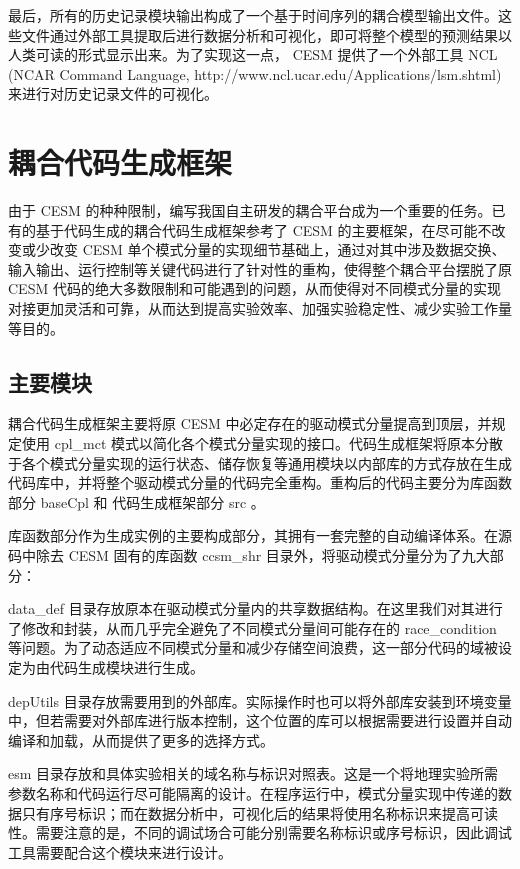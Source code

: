 最后，所有的历史记录模块输出构成了一个基于时间序列的耦合模型输出文件。这些文件通过外部工具提取后进行数据分析和可视化，即可将整个模型的预测结果以人类可读的形式显示出来。为了实现这一点， CESM 提供了一个外部工具 NCL (NCAR Command Language, http://www.ncl.ucar.edu/Applications/lsm.shtml)来进行对历史记录文件的可视化。

\section{耦合代码生成框架}

由于 CESM 的种种限制，编写我国自主研发的耦合平台成为一个重要的任务。已有的基于代码生成的耦合代码生成框架参考了 CESM 的主要框架，在尽可能不改变或少改变 CESM 单个模式分量的实现细节基础上，通过对其中涉及数据交换、输入输出、运行控制等关键代码进行了针对性的重构，使得整个耦合平台摆脱了原 CESM 代码的绝大多数限制和可能遇到的问题，从而使得对不同模式分量的实现对接更加灵活和可靠，从而达到提高实验效率、加强实验稳定性、减少实验工作量等目的。

\subsection{主要模块}

耦合代码生成框架主要将原 CESM 中必定存在的驱动模式分量提高到顶层，并规定使用 cpl\_mct 模式以简化各个模式分量实现的接口。代码生成框架将原本分散于各个模式分量实现的运行状态、储存恢复等通用模块以内部库的方式存放在生成代码库中，并将整个驱动模式分量的代码完全重构。重构后的代码主要分为库函数部分 baseCpl 和 代码生成框架部分 src 。

库函数部分作为生成实例的主要构成部分，其拥有一套完整的自动编译体系。在源码中除去 CESM 固有的库函数 ccsm\_shr 目录外，将驱动模式分量分为了九大部分：

data\_def 目录存放原本在驱动模式分量内的共享数据结构。在这里我们对其进行了修改和封装，从而几乎完全避免了不同模式分量间可能存在的 race\_condition 等问题。为了动态适应不同模式分量和减少存储空间浪费，这一部分代码的域被设定为由代码生成模块进行生成。

depUtils 目录存放需要用到的外部库。实际操作时也可以将外部库安装到环境变量中，但若需要对外部库进行版本控制，这个位置的库可以根据需要进行设置并自动编译和加载，从而提供了更多的选择方式。

esm 目录存放和具体实验相关的域名称与标识对照表。这是一个将地理实验所需参数名称和代码运行尽可能隔离的设计。在程序运行中，模式分量实现中传递的数据只有序号标识；而在数据分析中，可视化后的结果将使用名称标识来提高可读性。需要注意的是，不同的调试场合可能分别需要名称标识或序号标识，因此调试工具需要配合这个模块来进行设计。

